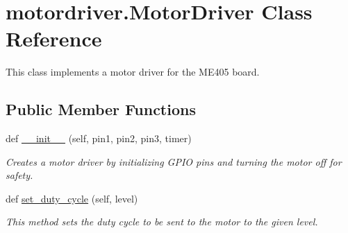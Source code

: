 \hypertarget{classmotordriver_1_1MotorDriver}{}\section{motordriver.\+Motor\+Driver Class Reference}
\label{classmotordriver_1_1MotorDriver}


This class implements a motor driver for the M\+E405 board.  


\subsection*{Public Member Functions}
\begin{DoxyCompactItemize}
\item 
def \mbox{\hyperlink{classmotordriver_1_1MotorDriver_a2b8897caed588f128042fc1521e3057c}{\+\_\+\+\_\+init\+\_\+\+\_\+}} (self, pin1, pin2, pin3, timer)
\begin{DoxyCompactList}\small\item\em Creates a motor driver by initializing G\+P\+IO pins and turning the motor off for safety. \end{DoxyCompactList}\item 
def \mbox{\hyperlink{classmotordriver_1_1MotorDriver_aaf4bde268698934aea24cf23343bc556}{set\+\_\+duty\+\_\+cycle}} (self, level)
\begin{DoxyCompactList}\small\item\em This method sets the duty cycle to be sent to the motor to the given level. \end{DoxyCompactList}\end{DoxyCompactItemize}
